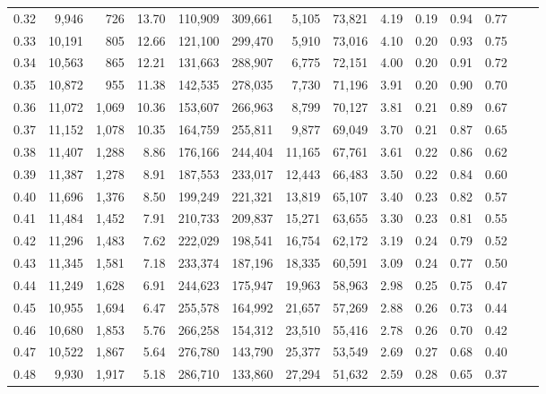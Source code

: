 \begin{tabular}{rrrrrrrrrrrrrr}
0.32 &   9,946 &    726 &   13.70 &  110,909 &  309,661 &   5,105 &  73,821 &  4.19 &  0.19 &  0.94 &      0.77 \\
0.33 &  10,191 &    805 &   12.66 &  121,100 &  299,470 &   5,910 &  73,016 &  4.10 &  0.20 &  0.93 &      0.75 \\
0.34 &  10,563 &    865 &   12.21 &  131,663 &  288,907 &   6,775 &  72,151 &  4.00 &  0.20 &  0.91 &      0.72 \\
0.35 &  10,872 &    955 &   11.38 &  142,535 &  278,035 &   7,730 &  71,196 &  3.91 &  0.20 &  0.90 &      0.70 \\
0.36 &  11,072 &  1,069 &   10.36 &  153,607 &  266,963 &   8,799 &  70,127 &  3.81 &  0.21 &  0.89 &      0.67 \\
0.37 &  11,152 &  1,078 &   10.35 &  164,759 &  255,811 &   9,877 &  69,049 &  3.70 &  0.21 &  0.87 &      0.65 \\
0.38 &  11,407 &  1,288 &    8.86 &  176,166 &  244,404 &  11,165 &  67,761 &  3.61 &  0.22 &  0.86 &      0.62 \\
0.39 &  11,387 &  1,278 &    8.91 &  187,553 &  233,017 &  12,443 &  66,483 &  3.50 &  0.22 &  0.84 &      0.60 \\
0.40 &  11,696 &  1,376 &    8.50 &  199,249 &  221,321 &  13,819 &  65,107 &  3.40 &  0.23 &  0.82 &      0.57 \\
0.41 &  11,484 &  1,452 &    7.91 &  210,733 &  209,837 &  15,271 &  63,655 &  3.30 &  0.23 &  0.81 &      0.55 \\
0.42 &  11,296 &  1,483 &    7.62 &  222,029 &  198,541 &  16,754 &  62,172 &  3.19 &  0.24 &  0.79 &      0.52 \\
0.43 &  11,345 &  1,581 &    7.18 &  233,374 &  187,196 &  18,335 &  60,591 &  3.09 &  0.24 &  0.77 &      0.50 \\
0.44 &  11,249 &  1,628 &    6.91 &  244,623 &  175,947 &  19,963 &  58,963 &  2.98 &  0.25 &  0.75 &      0.47 \\
0.45 &  10,955 &  1,694 &    6.47 &  255,578 &  164,992 &  21,657 &  57,269 &  2.88 &  0.26 &  0.73 &      0.44 \\
0.46 &  10,680 &  1,853 &    5.76 &  266,258 &  154,312 &  23,510 &  55,416 &  2.78 &  0.26 &  0.70 &      0.42 \\
0.47 &  10,522 &  1,867 &    5.64 &  276,780 &  143,790 &  25,377 &  53,549 &  2.69 &  0.27 &  0.68 &      0.40 \\
0.48 &   9,930 &  1,917 &    5.18 &  286,710 &  133,860 &  27,294 &  51,632 &  2.59 &  0.28 &  0.65 &      0.37 \\

\end{tabular}
